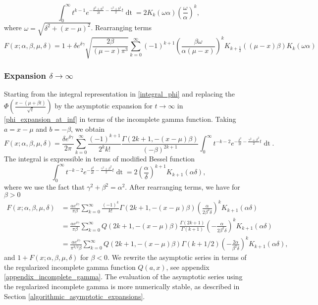 \documentclass[10pt,a4paper,oneside]{article}
\numberwithin{equation}{section}
\begin{document}
\begin{equation}
\int_0^{\infty}t^{k-1} e^{-\frac{\delta^2 + a^2}{2t} -\frac{\gamma^2 + b^2}{2}t} \mathop{dt} = 2 K_k(\omega \alpha) \left(\frac{\omega}{\alpha}\right)^k,
\end{equation}
where $\omega = \sqrt{\delta^2 + (x-\mu)^2}$. Rearranging terms
\begin{equation}
F(x; \alpha, \beta, \mu, \delta) = 1 + \delta e^{\delta \gamma} \sqrt{\frac{2\beta}{(\mu-x)\pi^3}}\sum_{k=0}^{\infty} (-1)^{k+1} \left(\frac{\beta \omega}{\alpha(\mu-x)}\right)^k K_{k + \frac{1}{2}}((\mu-x)\beta) K_k(\omega \alpha)
\end{equation}


\subsubsection{Expansion $\delta \to \infty$}
Starting from the integral representation in \eqref{integral_phi} and replacing the $\Phi\left(\frac{x-(\mu + \beta t)}{\sqrt{t}}\right)$ by the asymptotic expansion for $t\to \infty$ in \eqref{phi_expansion_at_inf} in terms of the incomplete gamma function. Taking $a = x -\mu$ and $b = -\beta$, we obtain
\begin{equation}
F(x; \alpha, \beta, \mu, \delta) = \frac{\delta e^{\delta \gamma}}{2\pi} \sum_{k=0}^{\infty}\frac{(-1)^{k+1}}{2^k k!} \frac{\Gamma(2k+1, -(x-\mu)\beta)}{(-\beta)^{2k+1}} \int_0^{\infty} t^{-k-2} e^{-\frac{\delta^2}{2t} - \frac{\gamma^2 + \beta^2}{2}t} \mathop{dt}.
\end{equation}
The integral is expressible in terms of modified Bessel function
\begin{equation}
\int_0^{\infty} t^{-k-2} e^{-\frac{\delta^2}{2t} - \frac{\gamma^2 + \beta^2}{2}t} \mathop{dt} = 2 \left(\frac{\alpha}{\delta}\right)^{k + 1} K_{k+1}(\alpha \delta),
\end{equation}
where we use the fact that $\gamma^2+ \beta^2 = \alpha^2$. After rearranging terms, we have for $\beta > 0$
\begin{align}
F(x; \alpha, \beta, \mu, \delta) &= \frac{\alpha e^{\delta \gamma}}{\pi \beta}\sum_{k=0}^{\infty} \frac{(-1)^k}{k!} \Gamma(2k + 1, -(x-\mu)\beta)\left(\frac{\alpha}{2\beta^2 \delta}\right)^k K_{k+1}(\alpha \delta)\\
 &=\frac{\alpha e^{\delta \gamma}}{\pi \beta}\sum_{k=0}^{\infty} Q(2k + 1, -(x-\mu)\beta)\frac{\Gamma(2k+1)}{\Gamma(k+1)}\left(-\frac{\alpha}{2\beta^2 \delta}\right)^k K_{k+1}(\alpha \delta)\\
 &=\frac{\alpha e^{\delta \gamma}}{\pi^{3/2} \beta}\sum_{k=0}^{\infty} Q(2k + 1, -(x-\mu)\beta) \Gamma(k + 1/2)\left(-\frac{2\alpha}{\beta^2 \delta}\right)^k K_{k+1}(\alpha \delta),
\end{align}
and $1 + F(x; \alpha, \beta, \mu, \delta)$ for $\beta < 0$. We rewrite the asymptotic series in terms of the regularized incomplete gamma function $Q(a, x)$, see appendix \ref{appendix_incomplete_gamma}. The evaluation of the asymptotic series using the regularized incomplete gamma is more numerically stable, as described in Section \ref{algorithmic_asymptotic_expansions}.
\end{document}
